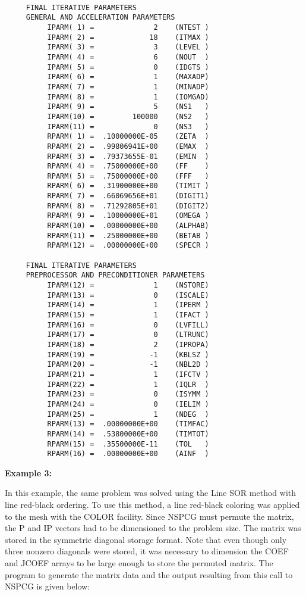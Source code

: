 \begin{verbatim}
 
     FINAL ITERATIVE PARAMETERS
     GENERAL AND ACCELERATION PARAMETERS
          IPARM( 1) =              2    (NTEST )
          IPARM( 2) =             18    (ITMAX )
          IPARM( 3) =              3    (LEVEL )
          IPARM( 4) =              6    (NOUT  )
          IPARM( 5) =              0    (IDGTS )
          IPARM( 6) =              1    (MAXADP)
          IPARM( 7) =              1    (MINADP)
          IPARM( 8) =              1    (IOMGAD)
          IPARM( 9) =              5    (NS1   )
          IPARM(10) =         100000    (NS2   )
          IPARM(11) =              0    (NS3   )
          RPARM( 1) =  .10000000E-05    (ZETA  )
          RPARM( 2) =  .99806941E+00    (EMAX  )
          RPARM( 3) =  .79373655E-01    (EMIN  )
          RPARM( 4) =  .75000000E+00    (FF    )
          RPARM( 5) =  .75000000E+00    (FFF   )
          RPARM( 6) =  .31900000E+00    (TIMIT )
          RPARM( 7) =  .66069656E+01    (DIGIT1)
          RPARM( 8) =  .71292805E+01    (DIGIT2)
          RPARM( 9) =  .10000000E+01    (OMEGA )
          RPARM(10) =  .00000000E+00    (ALPHAB)
          RPARM(11) =  .25000000E+00    (BETAB )
          RPARM(12) =  .00000000E+00    (SPECR )
 
     FINAL ITERATIVE PARAMETERS
     PREPROCESSOR AND PRECONDITIONER PARAMETERS
          IPARM(12) =              1    (NSTORE)
          IPARM(13) =              0    (ISCALE)
          IPARM(14) =              1    (IPERM )
          IPARM(15) =              1    (IFACT )
          IPARM(16) =              0    (LVFILL)
          IPARM(17) =              0    (LTRUNC)
          IPARM(18) =              2    (IPROPA)
          IPARM(19) =             -1    (KBLSZ )
          IPARM(20) =             -1    (NBL2D )
          IPARM(21) =              1    (IFCTV )
          IPARM(22) =              1    (IQLR  )
          IPARM(23) =              0    (ISYMM )
          IPARM(24) =              0    (IELIM )
          IPARM(25) =              1    (NDEG  )
          RPARM(13) =  .00000000E+00    (TIMFAC)
          RPARM(14) =  .53800000E+00    (TIMTOT)
          RPARM(15) =  .35500000E-11    (TOL   )
          RPARM(16) =  .00000000E+00    (AINF  )
\end{verbatim}
\newpage 
\noindent
{\bf Example 3:}
\bigskip
\indent

In this example, the same problem was solved using the Line SOR 
method  with line red-black ordering.  To use this method, 
a line red-black coloring was applied to the mesh with the COLOR 
facility.  Since NSPCG must permute the matrix, the P and IP 
vectors had to be dimensioned to the problem size.  The matrix
was stored in the symmetric diagonal storage format.  Note that
even though only three nonzero diagonals were stored, it was
necessary to dimension the COEF and JCOEF arrays to be large
enough to store the permuted matrix.  The program to generate the 
matrix data and the output resulting from this call to NSPCG is 
given below:

